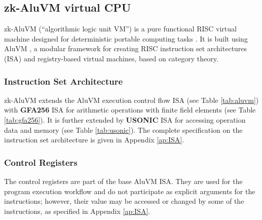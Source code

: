 \documentclass[9pt,oneside]{amsart}
\begin{document}
\begin{multicols}{2}

\subsection{zk-AluVM virtual CPU}\label{AluVM}

zk-AluVM (``algorithmic logic unit VM'') is a pure functional RISC virtual machine
designed for deterministic portable computing tasks \cite{zkAluVM}.
It is built using AluVM \cite{AluVM, AluVMCrate},
a modular framework for creating RISC instruction set architectures (ISA)
and registry-based virtual machines, based on category theory.

\subsubsection{Instruction Set Architecture}

zk-AluVM extends the AluVM execution control flow ISA (see Table \ref{tab:aluvm})
with \textbf{GFA256} ISA for arithmetic operations
with finite field elements (see Table \ref{tab:gfa256}).
It is further extended by \textbf{USONIC} ISA
for accessing operation data and memory (see Table \ref{tab:usonic}).
The complete specification on the instruction set architecture is given in Appendix \ref{ap:ISA}.

\subsubsection{Control Registers}\label{Registers}

The control registers are part of the base AluVM ISA.
They are used for the program execution workflow and do not participate
as explicit arguments for the instructions; however, their value may be accessed or changed
by some of the instructions, as specified in Appendix \ref{ap:ISA}.


\end{multicols}
\end{document}
